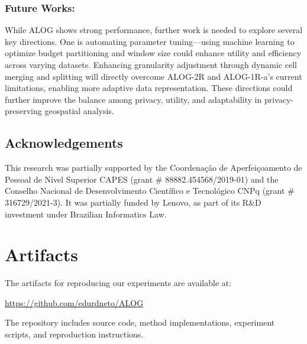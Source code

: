 
\subsubsection*{Future Works:}
While ALOG shows strong performance, further work is needed to explore several key directions. One is automating parameter tuning—using machine learning to optimize budget partitioning and window size could enhance utility and efficiency across varying datasets.
Enhancing granularity adjustment through dynamic cell merging and splitting will directly overcome ALOG-2R and ALOG-1R-a's current limitations, enabling more adaptive data representation.
These directions could further improve the balance among privacy, utility, and adaptability in privacy-preserving geospatial analysis.

\subsection*{Acknowledgements}
This research was partially supported by the Coordenação de Aperfeiçoamento de Pessoal de Nível Superior CAPES (grant \# 88882.454568/2019-01) and the Conselho Nacional de Desenvolvimento Científico e Tecnológico CNPq
(grant \# 316729/2021-3).
It was partially funded by Lenovo, as part of its R\&D investment under Brazilian Informatics Law. 


\section{Artifacts}

The artifacts for reproducing our experiments are available at:

\begin{center}
    \url{https://github.com/edurdneto/ALOG}
\end{center}

The repository includes source code, method implementations, experiment scripts, and reproduction instructions.
